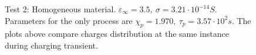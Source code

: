 \documentclass[11pt,a4paper]{article}
\begin{document}
\begin{figure}
{	}
	\hspace*{0.01\textwidth}
	\hspace*{0.01\textwidth}
	
	\caption{Test 2: Homogeneous material. \(\varepsilon_\infty = 3.5,\ \sigma = 3.21\cdot 10^{-14}S\). Parameters for the only process are \(\chi_p = 1.970,\ \tau_p = 3.57\cdot 10^{2}s\). The plots above compare charges distribution at the same instance during charging transient.}
	\label{fig:test2}
	
\end{figure}
\end{document}
